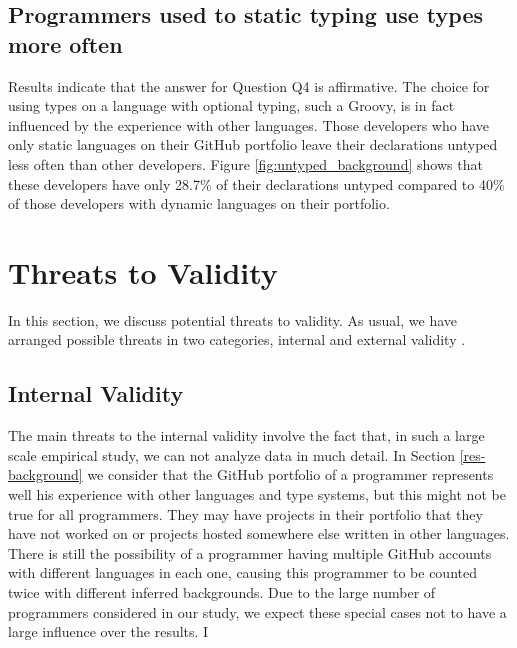 \documentclass[preprint]{sigplanconf}
\begin{document}
\subsection{Programmers used to static typing use types more often\label{discussion-q4}}
Results indicate that the answer for Question Q4 is affirmative.
The choice for using types on a language with optional typing, such a Groovy, is in fact influenced by the experience  with other languages.
Those developers who have only static languages on their GitHub portfolio leave their declarations untyped less often than other developers.
Figure \ref{fig:untyped_background} shows that these developers have only 28.7\% of their declarations untyped compared to 40\% of those developers with dynamic languages on their portfolio. 











%
%
\section{Threats to Validity\label{threats}}
In this section, we discuss potential threats to validity. As usual, we have arranged possible threats in two categories, internal and external validity \cite{Wohlin2012}. 

\subsection*{Internal Validity}
The main threats to the internal validity involve the fact that, in such a large scale empirical study, we can not analyze data in much detail. 
In Section \ref{res-background} we consider that the GitHub portfolio of a programmer represents well his experience with other languages and type systems, but this might not be true for all programmers.
They may have projects in their portfolio that they have not worked on or projects hosted somewhere else written in other languages.
There is still the possibility of a programmer having multiple GitHub accounts with different languages in each one, causing this programmer to be counted twice with different inferred backgrounds.
Due to the large number of programmers considered in our study, we expect these special cases not to have a large influence over the results.
I%
\end{document}
